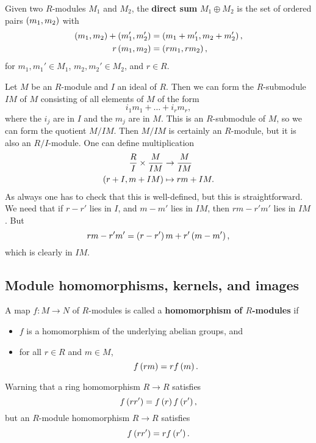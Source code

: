 \begin{definition}
Given two $ R $-modules $ M_1 $ and $ M_2 $, the \textbf{direct sum} $ M_1 \oplus M_2 $ is the set of ordered pairs $ \left( m_1, m_2 \right) $ with
\begin{align*}
\left( m_1, m_2 \right) + \left( m_1', m_2' \right) & = \left( m_1 + m_1', m_2 + m_2' \right), \\
r\left( m_1, m_2 \right) & = \left( rm_1, rm_2 \right),
\end{align*}
for $ m_1, m_1' \in M_1 $, $ m_2, m_2' \in M_2 $, and $ r \in R $.
\end{definition}

\begin{example2}
Let $ M $ be an $ R $-module and $ I $ an ideal of $ R $. Then we can form the $ R $-submodule $ IM $ of $ M $ consisting of all elements of $ M $ of the form
$$ i_1m_1 + \dots + i_rm_r, $$
where the $ i_j $ are in $ I $ and the $ m_j $ are in $ M $. This is an $ R $-submodule of $ M $, so we can form the quotient $ M / IM $. Then $ M / IM $ is certainly an $ R $-module, but it is also an $ R / I $-module. One can define multiplication
\begin{align*}
\dfrac{R}{I} \times \dfrac{M}{IM} & \to \dfrac{M}{IM} \\
\left( r + I, m + IM \right) & \mapsto rm + IM.
\end{align*}
As always one has to check that this is well-defined, but this is straightforward. We need that if $ r - r' $ lies in $ I $, and $ m - m' $ lies in $ IM $, then $ rm - r'm' $ lies in $ IM $. But
$$ rm - r'm' = \left( r - r' \right)m + r'\left( m - m' \right), $$
which is clearly in $ IM $.
\end{example2}

\subsection{Module homomorphisms, kernels, and images}

\begin{definition}
A map $ f : M \to N $ of $ R $-modules is called a \textbf{homomorphism of $ R $-modules} if
\begin{itemize}
\item $ f $ is a homomorphism of the underlying abelian groups, and
\item for all $ r \in R $ and $ m \in M $,
$$ f\left( rm \right) = rf\left( m \right). $$
\end{itemize}
\end{definition}

Warning that a ring homomorphism $ R \to R $ satisfies
$$ f\left( rr' \right) = f\left( r \right)f\left( r' \right), $$
but an $ R $-module homomorphism $ R \to R $ satisfies
$$ f\left( rr' \right) = rf\left( r' \right). $$

